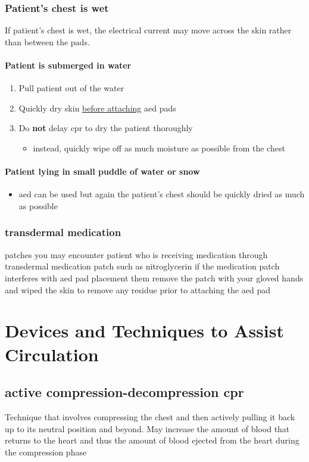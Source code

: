 \documentclass[../../EMT-169.tex]{subfiles}
\begin{document}
\subsubsection{Patient's chest is wet}
If patient's chest is wet, the electrical current may move across the skin rather than between the pads.
\paragraph{Patient is submerged in water} 
\begin{enumerate}
	\item Pull patient out of the water
	\item Quickly dry skin \underline{before attaching} \acrshort{aed} pads 
	\item Do \textbf{not} delay \acrshort{cpr} to dry the patient thoroughly
	\begin{itemize}
		\item instead, quickly wipe off as much moisture as possible from the chest
	\end{itemize}
\end{enumerate}

\paragraph{Patient lying in small puddle of water or snow}
\begin{itemize}
	\item \acrshort{aed} can be used but again the patient's chest should be quickly dried as much as possible
\end{itemize}

\subsubsection{transdermal medication} patches you may encounter patient who is receiving medication through transdermal medication patch such as nitroglycerin if the medication patch interferes with \acrshort{aed} pad placement them remove the patch with your gloved hands and wiped the skin to remove any residue prior to attaching the \acrshort{aed} pad

\section{Devices and Techniques to Assist Circulation}
\subsection{active compression-decompression \acrshort{cpr}} 
Technique that involves compressing the chest and then actively pulling it back up to its neutral position and beyond.
May increase the amount of blood that returns to the heart and thus the amount of blood ejected from the heart during the compression phase
\end{document}
